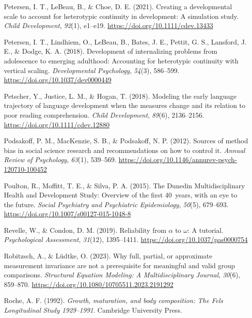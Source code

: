\documentclass[
  american,
  letterpaper,
  12pt]{article}
\newlength{\cslhangindent}
\newenvironment{CSLReferences}[2] %
 {\begin{list}{}{%
  \setlength{\itemindent}{0pt}
  \setlength{\leftmargin}{0pt}
  \setlength{\parsep}{0pt}
  \ifodd #1
   \setlength{\leftmargin}{\cslhangindent}
   \setlength{\itemindent}{-1\cslhangindent}
  \fi
  \setlength{\itemsep}{#2\baselineskip}}}
 {\end{list}}
\begin{document}
\begin{CSLReferences}{1}{0}
Petersen, I. T., LeBeau, B., \& Choe, D. E. (2021). Creating a
developmental scale to account for heterotypic continuity in
development: {A} simulation study. \emph{Child Development},
\emph{92}(1), e1--e19. \url{https://doi.org/10.1111/cdev.13433}

Petersen, I. T., Lindhiem, O., LeBeau, B., Bates, J. E., Pettit, G. S.,
Lansford, J. E., \& Dodge, K. A. (2018). Development of internalizing
problems from adolescence to emerging adulthood: {Accounting} for
heterotypic continuity with vertical scaling. \emph{Developmental
Psychology}, \emph{54}(3), 586--599.
\url{https://doi.org/10.1037/dev0000449}

Petscher, Y., Justice, L. M., \& Hogan, T. (2018). Modeling the early
language trajectory of language development when the measures change and
its relation to poor reading comprehension. \emph{Child Development},
\emph{89}(6), 2136--2156. \url{https://doi.org/10.1111/cdev.12880}

Podsakoff, P. M., MacKenzie, S. B., \& Podsakoff, N. P. (2012). Sources
of method bias in social science research and recommendations on how to
control it. \emph{Annual Review of Psychology}, \emph{63}(1), 539--569.
\url{https://doi.org/10.1146/annurev-psych-120710-100452}

Poulton, R., Moffitt, T. E., \& Silva, P. A. (2015). The {Dunedin
Multidisciplinary Health and Development Study}: {Overview} of the first
40~years, with an eye to the future. \emph{Social Psychiatry and
Psychiatric Epidemiology}, \emph{50}(5), 679--693.
\url{https://doi.org/10.1007/s00127-015-1048-8}

Revelle, W., \& Condon, D. M. (2019). Reliability from \(\alpha\) to
\(\omega\): {A} tutorial. \emph{Psychological Assessment},
\emph{31}(12), 1395--1411. \url{https://doi.org/10.1037/pas0000754}

Robitzsch, A., \& Lüdtke, O. (2023). Why full, partial, or approximate
measurement invariance are not a prerequisite for meaningful and valid
group comparisons. \emph{Structural Equation Modeling: A
Multidisciplinary Journal}, \emph{30}(6), 859--870.
\url{https://doi.org/10.1080/10705511.2023.2191292}

Roche, A. F. (1992). \emph{Growth, maturation, and body composition:
{The} {Fels Longitudinal Study} 1929--1991}. Cambridge University Press.


\end{CSLReferences}
\end{document}
